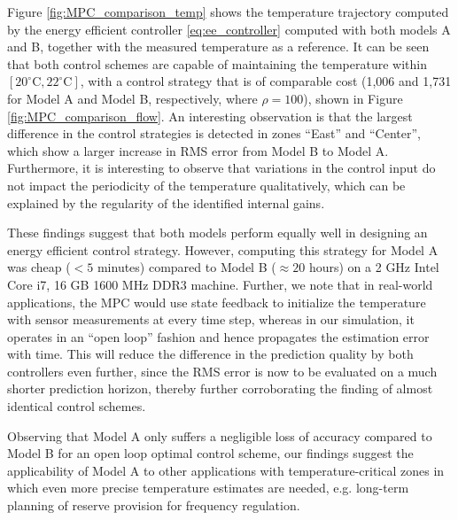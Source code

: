 Figure \ref{fig:MPC_comparison_temp} shows the temperature trajectory computed by the energy efficient controller \eqref{eq:ee_controller} computed with both models A and B, together with the measured temperature as a reference. 
It can be seen that both control schemes are capable of maintaining the temperature within $[20^\circ \text{C}, 22^\circ \text{C}]$, with a control strategy that is of comparable cost (1,006 and 1,731 for Model A and Model B, respectively, where $\rho=100$), shown in Figure \ref{fig:MPC_comparison_flow}. An interesting observation is that the largest difference in the control strategies is detected in zones ``East'' and ``Center'', which show a larger increase in RMS error from Model B to Model A.
Furthermore, it is interesting to observe that variations in the control input do not impact the periodicity of the temperature qualitatively, which can be explained by the regularity of the identified internal gains.

These findings suggest that both models perform equally well in designing an energy efficient control strategy. However, computing this strategy for Model A was cheap ($<5$ minutes) compared to Model B ($\approx 20$ hours) on a 2 GHz Intel Core i7, 16 GB 1600 MHz DDR3 machine. Further, we note that in real-world applications, the MPC would use state feedback to initialize the temperature with sensor measurements at every time step, whereas in our simulation, it operates in an ``open loop'' fashion and hence propagates the estimation error with time. This will reduce the difference in the prediction quality by both controllers even further, since the RMS error is now to be evaluated on a much shorter prediction horizon, thereby further corroborating the finding of almost identical control schemes.

Observing that Model A only suffers a negligible loss of accuracy compared to Model B for an open loop optimal control scheme, our findings suggest the applicability of Model A to other applications with temperature-critical zones in which even more precise temperature estimates are needed, e.g. long-term planning of reserve provision for frequency regulation.





